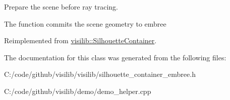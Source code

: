 Prepare the scene before ray tracing. 

The function commits the scene geometry to embree 

Reimplemented from \mbox{\hyperlink{classvisilib_1_1_silhouette_container}{visilib\+::\+Silhouette\+Container}}.



The documentation for this class was generated from the following files\+:\begin{DoxyCompactItemize}
\item 
C\+:/code/github/visilib/visilib/silhouette\+\_\+container\+\_\+embree.\+h\item 
C\+:/code/github/visilib/demo/demo\+\_\+helper.\+cpp\end{DoxyCompactItemize}
